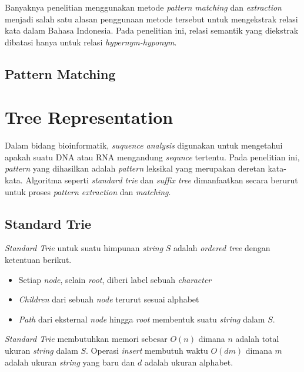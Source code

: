 Banyaknya penelitian menggunakan metode \textit{pattern matching} dan \textit{extraction} menjadi salah satu alasan penggunaan metode tersebut untuk mengekstrak relasi kata dalam Bahasa Indonesia. Pada penelitian ini, relasi semantik yang diekstrak dibatasi hanya untuk relasi \textit{hypernym-hyponym}. 

\subsection{Pattern Matching}


\section{Tree Representation}
Dalam bidang bioinformatik, \textit{suquence analysis} digunakan untuk mengetahui apakah suatu DNA atau RNA mengandung \textit{sequnce} tertentu. Pada penelitian ini, \textit{pattern} yang dihasilkan adalah \textit{pattern} leksikal yang merupakan deretan kata-kata. Algoritma seperti \textit{standard trie} dan \textit{suffix tree} dimanfaatkan secara berurut untuk proses \textit{pattern extraction} dan \textit{matching}.

\subsection{Standard Trie}
\textit{Standard Trie} untuk suatu himpunan \textit{string} $S$ adalah \textit{ordered tree} dengan ketentuan berikut.
\begin{itemize}
  \item Setiap \textit{node}, selain \textit{root}, diberi label sebuah \textit{character}
  \item \textit{Children} dari sebuah \textit{node} terurut sesuai alphabet
  \item \textit{Path} dari eksternal \textit{node} hingga \textit{root} membentuk suatu \textit{string} dalam $S$.
\end{itemize}
\textit{Standard Trie} membutuhkan memori sebesar $O(n)$ dimana $n$ adalah total ukuran \textit{string} dalam $S$. Operasi \textit{insert} membutuh waktu $O(dm)$ dimana $m$ adalah ukuran \textit{string} yang baru dan $d$ adalah ukuran alphabet.

